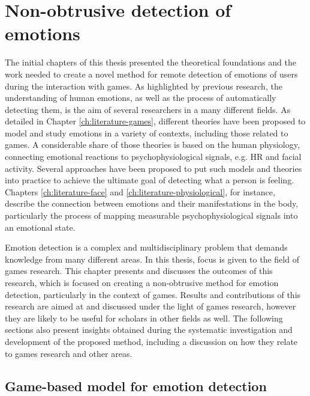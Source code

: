 \chapter{Non-obtrusive detection of emotions}
\label{ch:discussion}

The initial chapters of this thesis presented the theoretical foundations and the work needed to create a novel method for remote detection of emotions of users during the interaction with games. As highlighted by previous research, the understanding of human emotions, as well as the process of automatically detecting them, is the aim of several researchers in a many different fields. As detailed in Chapter \ref{ch:literature-games}, different theories have been proposed to model and study emotions in a variety of contexts, including those related to games. A considerable share of those theories is based on the human physiology, connecting emotional reactions to psychophysiological signals, e.g. HR and facial activity. Several approaches have been proposed to put such models and theories into practice to achieve the ultimate goal of detecting what a person is feeling. Chapters \ref{ch:literature-face} and \ref{ch:literature-physiological}, for instance, describe the connection between emotions and their manifestations in the body, particularly the process of mapping measurable psychophysiological signals into an emotional state.

Emotion detection is a complex and multidisciplinary problem that demands knowledge from many different areas. In this thesis, focus is given to the field of games research. This chapter presents and discusses the outcomes of this research, which is focused on creating a non-obtrusive method for emotion detection, particularly in the context of games. Results and contributions of this research are aimed at and discussed under the light of games research, however they are likely to be useful for scholars in other fields as well. The following sections also present insights obtained during the systematic investigation and development of the proposed method, including a discussion on how they relate to games research and other areas.

\section{\nohyphens{Game-based model for emotion detection}}

